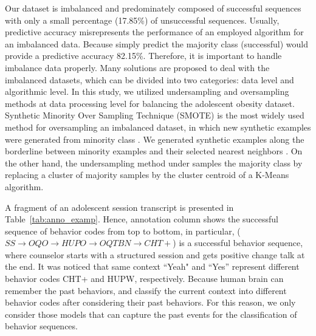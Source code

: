 \documentclass{amia_summit_2018}
\begin{document}
Our dataset is imbalanced and predominately composed of successful sequences with only a small percentage (17.85\%) of unsuccessful sequences. Usually, predictive accuracy misrepresents the performance of an employed algorithm for an imbalanced data. Because simply predict the majority class (successful) would provide a predictive accuracy 82.15\%. Therefore, it is important to handle imbalance data properly. Many solutions are proposed to deal with the imbalanced datasets, which can be divided into two categories: data level and algorithmic level. In this study, we utilized undersampling and oversampling methods at data processing level for balancing the adolescent obesity dataset. Synthetic Minority Over Sampling Technique (SMOTE) is the most widely used method for oversampling an imbalanced dataset, in which new synthetic examples were generated from minority class \cite{chawla2002smote}. We generated synthetic examples along the borderline between minority examples and their selected nearest neighbors \cite{nguyen2011borderline}. On the other hand, the undersampling method under samples the majority class by replacing a cluster of majority samples by the cluster centroid of a K-Means algorithm.  

A fragment of an adolescent session transcript is presented in Table~\ref{tab:anno_examp}. Hence, annotation column shows the successful sequence of behavior codes from top to bottom, in particular, ($SS\rightarrow OQO\rightarrow HUPO\rightarrow OQTBN\rightarrow CHT+$) is a successful behavior sequence, where counselor starts with a structured session and gets positive change talk at the end. It was noticed that same context ``Yeah" and ``Yes'' represent different behavior codes CHT+ and HUPW, respectively. Because human brain can remember the past behaviors, and classify the current context into different behavior codes after considering their past behaviors. For this reason, we only consider those models that can capture the past events for the classification of behavior sequences.\\
\end{document}
